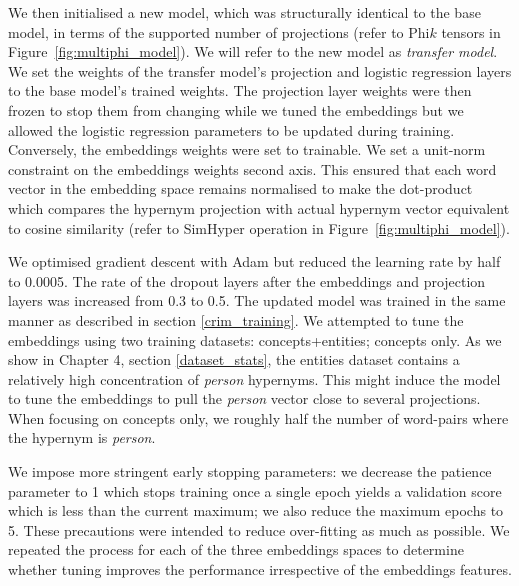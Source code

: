 We then initialised a new model, which was structurally identical to the base model, in terms of the supported number of projections (refer to Phi$k$ tensors in Figure~\ref{fig:multiphi_model}).  We will refer to the new model as \textit{transfer model}.  We set the weights of the transfer model's projection and logistic regression layers to the base model's trained weights.  The projection layer weights were then frozen to stop them from changing while we tuned the embeddings but we allowed the logistic regression parameters to be updated during training.  Conversely, the embeddings weights were set to trainable.  We set a unit-norm constraint on the embeddings weights second axis.  This ensured that each word vector in the embedding space remains normalised to make the dot-product which compares the hypernym projection with actual hypernym vector equivalent to cosine similarity (refer to SimHyper operation in Figure~\ref{fig:multiphi_model}).

We optimised gradient descent with Adam \citep{kingma2014adam} but reduced the learning rate by half to 0.0005.  The rate of the dropout layers after the embeddings and projection layers was increased from 0.3 to 0.5.  The updated model was trained in the same manner as described in section \ref{crim_training}.  We attempted to tune the embeddings using two training datasets: concepts+entities; concepts only.  As we show in Chapter 4, section \ref{dataset_stats}, the entities dataset contains a relatively high concentration of \textit{person} hypernyms.  This might induce the model to tune the embeddings to pull the \textit{person} vector close to several projections.  When focusing on concepts only, we roughly half the number of word-pairs where the hypernym is \textit{person}.

We impose more stringent early stopping parameters: we decrease the patience parameter to 1 which stops training once a single epoch yields a validation score which is less than the current maximum; we also reduce the maximum epochs to 5.  These precautions were intended to reduce over-fitting as much as possible.  We repeated the process for each of the three embeddings spaces to determine whether tuning improves the performance irrespective of the embeddings features.